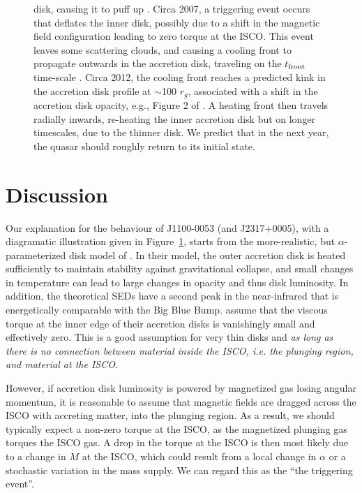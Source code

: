 \documentclass{nature}
\begin{document}
\begin{figure}
{disk, causing it to puff up \citep[e.g.,][]{Zimmerman2005}. Circa
2007, a triggering event occurs that deflates the inner disk, possibly
due to a shift in the magnetic field configuration leading to zero
torque at the ISCO.  This event leaves some scattering clouds, and
causing a cooling front to propagate outwards in the accretion disk,
traveling on the $t_{\rm front}$ time-scale 
\citep[see also][]{Hameury2009}. 
 Circa 2012, the cooling
front reaches a predicted kink in the accretion disk profile at
$\sim$100 $r_{g}$, associated with a shift in the accretion disk
opacity, e.g., Figure 2 of \cite{Sirko_Goodman2003}. A heating front
then travels radially inwards, re-heating the inner accretion disk but
on longer timescales, due to the thinner disk. We predict that in the
next year, the quasar should roughly return to its initial state.}
  \label{fig:J110057_diskmodel}
\end{figure}

\section{Discussion} 
Our explanation for the behaviour of J1100-0053 (and J2317+0005), with a diagramatic illustration given in Figure~\ref{fig:J110057_diskmodel}, starts from the more-realistic, but $\alpha$-parameterized disk model of \cite{Sirko_Goodman2003}. In their model, the outer accretion disk is heated sufficiently to maintain stability against gravitational collapse, and small changes in temperature can lead to large changes in opacity and thus disk luminosity. In addition, the theoretical SEDs have a second peak in the near-infrared that is energetically comparable with the Big Blue Bump. \cite{Sirko_Goodman2003} assume that the viscous torque at the inner edge of their accretion disks is vanishingly small and effectively zero. This is a good assumption for very thin disks and \emph{as long as there is no connection between material inside the ISCO, i.e. the plunging region, and material at the ISCO}. 

However, if accretion disk luminosity is powered by magnetized gas losing angular momentum, it is reasonable to assume that magnetic fields are dragged across the ISCO with accreting matter, into the plunging region. As a result, we should typically expect a non-zero torque at the ISCO, as the magnetized plunging gas torques the ISCO gas. A drop in the torque at the ISCO is then most likely due to a change in $\dot{M}$ at the ISCO, which could result from a local change in $\alpha$ or a stochastic variation in the mass supply. We can regard this as the ``the triggering event''.
\end{document}
